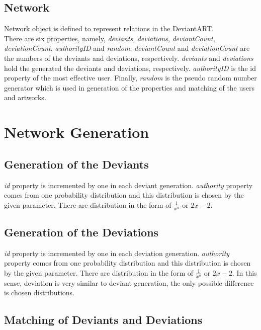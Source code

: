 \documentclass[12pt,a4paper]{report}
\begin{document}
\section{Network} 

	Network object is defined to represent relations in the DeviantART. \\

	There are six properties, namely, \emph{deviants}, \emph{deviations}, \emph{deviantCount}, \emph{deviationCount}, \emph{authorityID} and \emph{random}.	 \emph{deviantCount} and \emph{deviationCount} are the numbers of the deviants and deviations, respectively. \emph{deviants} and \emph{deviations} hold the generated the deviants and deviations, respectively. \emph{authorityID} is the {id} property of the most effective user. Finally, \emph{random} is the pseudo random number generator which is used in generation of the properties and matching of the users and artworks. 

\chapter{Network Generation}

\section{Generation of the Deviants}

	\emph{id} property is incremented by one in each deviant generation. \emph{authority} property comes from one probability distribution and this distribution is chosen by the given parameter. There are distribution in the form of $\frac{1}{x^n}$ or $2x - 2$.

\section{Generation of the Deviations}

	\emph{id} property is incremented by one in each deviation generation. \emph{authority} property comes from one probability distribution and this distribution is chosen by the given parameter. There are distribution in the form of $\frac{1}{x^n}$ or $2x - 2$. In this sense, deviation is very similar to deviant generation, the only possible difference is chosen distributions.

\clearpage

\section{Matching of Deviants and Deviations}	
	
\end{document}
